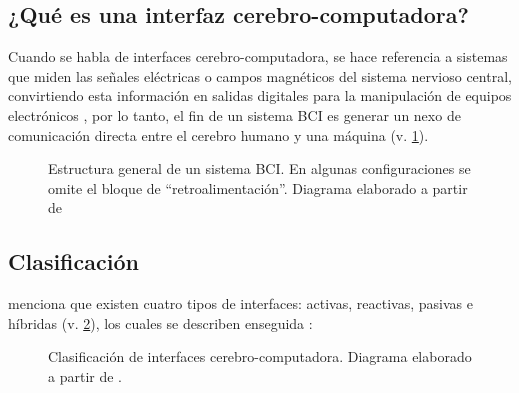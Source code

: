     \subsection{¿Qué es una interfaz cerebro-computadora?}
    
        Cuando se habla de interfaces cerebro-computadora, se hace referencia a sistemas que miden las señales eléctricas o campos magnéticos del sistema nervioso central, convirtiendo esta información en salidas digitales para la manipulación de equipos electrónicos \cite{AlonsoValerdi2019,MoranGarcia2015}, por lo tanto, el fin de un sistema BCI es generar un nexo de comunicación directa entre el cerebro humano y una máquina (v. \cref{fig:bci basic structure}).
        
        \begin{figure}[htb!]
            \centering
            
            \caption[Estructura general de un sistema BCI]{Estructura general de un sistema BCI. En algunas configuraciones se omite el bloque de ``retroalimentación''. Diagrama elaborado a partir de \cite[Fig. 2]{SanchezGarcia2017}}
            \label{fig:bci basic structure}
        \end{figure}
        
    \subsection{Clasificación}
    
        \citet{AlonsoValerdi2019} menciona que existen cuatro tipos de interfaces: activas, reactivas, pasivas e híbridas (v. \cref{fig:bci types}), los cuales se describen enseguida \cite[p. 5]{AlonsoValerdi2019}:
    
        \begin{figure}[htb!]
            \centering
            
            \caption[Clasificación de interfaces cerebro-computadora]{Clasificación de interfaces cerebro-computadora. Diagrama elaborado a partir de \cite[Fig. 1]{AlonsoValerdi2019}.}
            \label{fig:bci types}
        \end{figure}
        
